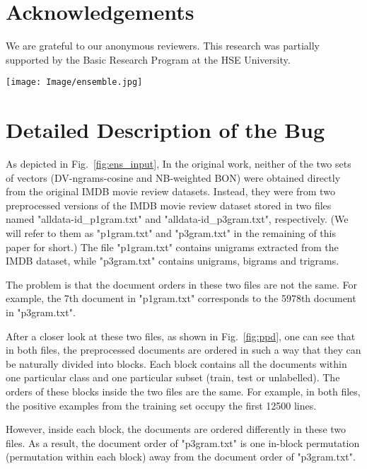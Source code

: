 \documentclass[11pt]{article}
\begin{document}
\section*{Acknowledgements}
We are grateful to our anonymous reviewers. This research was partially supported by the Basic Research Program at the HSE University.





\clearpage
\appendix

\begin{figure*}[t]
    \centering \texttt{[image: Image/ensemble.jpg]} 
    \caption{Diagram of the ensemble and its input in the original code}
    \label{fig:ens_input}
\end{figure*}

\section{Detailed Description of the Bug}
\label{sec:appendix_bug}
As depicted in Fig.~\ref{fig:ens_input}, In the original work, neither of the two sets of vectors (DV-ngrams-cosine and NB-weighted BON) were obtained directly from the original IMDB movie review datasets. Instead, they were from two preprocessed versions of the IMDB movie review dataset stored in two files named "alldata-id\_p1gram.txt" and "alldata-id\_p3gram.txt", respectively. (We will refer to them as "p1gram.txt" and "p3gram.txt" in the remaining of this paper for short.) The file "p1gram.txt" contains unigrams extracted from the IMDB dataset, while "p3gram.txt" contains unigrams, bigrams and trigrams.

The problem is that the document orders in these two files are not the same. For example, the 7th document in "p1gram.txt" corresponds to the 5978th document in "p3gram.txt".

After a closer look at these two files, as shown in Fig.~\ref{fig:ppd}, one can see that in both files, the preprocessed documents are ordered in such a way that they can be naturally divided into blocks. Each block contains all the documents within one particular class and one particular subset (train, test or unlabelled). The orders of these blocks inside the two files are the same. For example, in both files, the positive examples from the training set occupy the first 12500 lines. 

However, inside each block, the documents are ordered differently in these two files. As a result, the document order of "p3gram.txt" is one in-block permutation (permutation within each block) away from the document order of "p3gram.txt".
\end{document}

